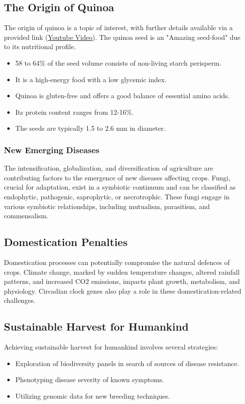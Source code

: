 \subsection{The Origin of Quinoa} 
The origin of quinoa is a topic of interest, with further details available via a provided link (\href{www.youtube.com/watch?v=7dmjOjoog4A}{Youtube Video}). The quinoa seed is an "Amazing seed-food" due to its nutritional profile. 
\begin{itemize} 
    \item 58 to 64\% of the seed volume consists of non-living starch perisperm. 
    \item It is a high-energy food with a low glycemic index. 
    \item Quinoa is gluten-free and offers a good balance of essential amino acids. 
    \item Its protein content ranges from 12-16\%. 
    \item The seeds are typically 1.5 to 2.6 mm in diameter. 
\end{itemize}

\subsubsection*{New Emerging Diseases} 
The intensification, globalization, and diversification of agriculture are contributing factors to the emergence of new diseases affecting crops. Fungi, crucial for adaptation, exist in a symbiotic continuum and can be classified as endophytic, pathogenic, saprophytic, or necrotrophic. These fungi engage in various symbiotic relationships, including mutualism, parasitism, and commensalism.

\subsection{Domestication Penalties} 
Domestication processes can potentially compromise the natural defences of crops. Climate change, marked by sudden temperature changes, altered rainfall patterns, and increased CO2 emissions, impacts plant growth, metabolism, and physiology. Circadian clock genes also play a role in these domestication-related challenges.

\subsection{Sustainable Harvest for Humankind} 
Achieving sustainable harvest for humankind involves several strategies: 
\begin{itemize} 
    \item Exploration of biodiversity panels in search of sources of disease resistance. 
    \item Phenotyping disease severity of known symptoms. 
    \item Utilizing genomic data for new breeding techniques. 
\end{itemize}

